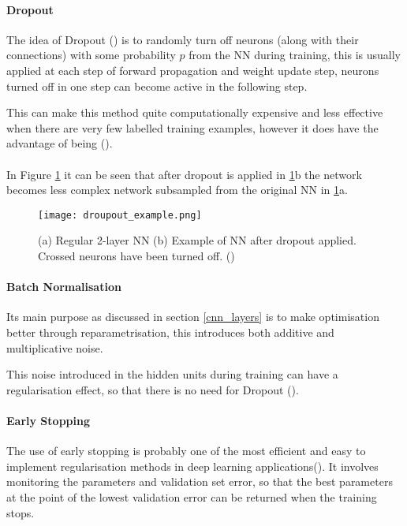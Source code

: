 \paragraph{Dropout} 
The idea of Dropout (\cite{JMLR:v15:srivastava14a}) is to randomly turn off neurons (along with their connections) with some probability $p$ from the \gls{NN} during training, this is usually applied at each step of forward propagation and weight update step, neurons turned off in one step can become active in the following step.

This can make this method quite computationally expensive and less effective when there are very few labelled training examples, however it does have the advantage of being (\cite{GoodBengCour16}).
\paragraph{}
In Figure \ref{fig_dropout} it can be seen that after dropout is applied in \ref{fig_dropout}b the network becomes less complex network subsampled from the original \gls{NN} in \ref{fig_dropout}a.

    \begin{figure}[hbt!]
        \centering
        \texttt{[image: droupout\_example.png]}
        \caption{(a) Regular 2-layer \gls{NN} (b) Example of \gls{NN} after dropout applied. Crossed neurons have been turned off. (\cite{shanmugamani2018deep})}
        \label{fig_dropout}
    \end{figure}

\paragraph{Batch Normalisation}
Its main purpose as discussed in section \ref{cnn_layers} is to make optimisation better through reparametrisation, this introduces both additive and multiplicative noise.

This noise introduced in the hidden units during training can have a regularisation effect, so that there is no need for Dropout (\cite{GoodBengCour16}).

\paragraph{Early Stopping} 
The use of early stopping is probably one of the most efficient and easy to implement regularisation methods in deep learning applications(\cite{GoodBengCour16}). It involves monitoring the parameters and validation set error, so that the best parameters at the point of the lowest validation error can be returned when the training stops. 

